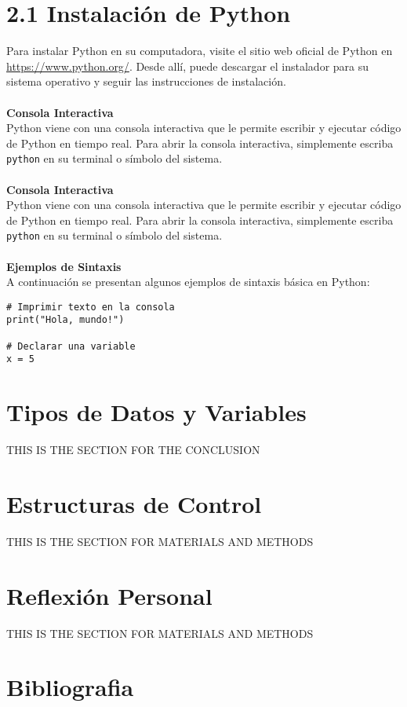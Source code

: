 \documentclass[a4paper, 12pt]{article}
\begin{document}
\section*{2.1 Instalación de Python}
Para instalar Python en su computadora, visite el sitio web oficial de Python en \url{https://www.python.org/}. Desde allí, puede descargar el instalador para su sistema operativo y seguir las instrucciones de instalación.
\\
\\
\textbf{Consola Interactiva}\\
Python viene con una consola interactiva que le permite escribir y ejecutar código de Python en tiempo real. Para abrir la consola interactiva, simplemente escriba \texttt{python} en su terminal o símbolo del sistema.
\\
\\
\textbf{Consola Interactiva}\\
Python viene con una consola interactiva que le permite escribir y ejecutar código de Python en tiempo real. Para abrir la consola interactiva, simplemente escriba \texttt{python} en su terminal o símbolo del sistema.
\\
\\
\textbf{Ejemplos de Sintaxis}\\
A continuación se presentan algunos ejemplos de sintaxis básica en Python:

\begin{verbatim}
# Imprimir texto en la consola
print("Hola, mundo!")

# Declarar una variable
x = 5
\end{verbatim}

\clearpage
\section{Tipos de Datos y Variables}
THIS IS THE SECTION FOR THE CONCLUSION

\clearpage
\section{Estructuras de Control}
THIS IS THE SECTION FOR MATERIALS AND METHODS

\clearpage
\section{Reflexión Personal}
THIS IS THE SECTION FOR MATERIALS AND METHODS

\clearpage
\section{Bibliografia}
\printbibliography
\end{document}
